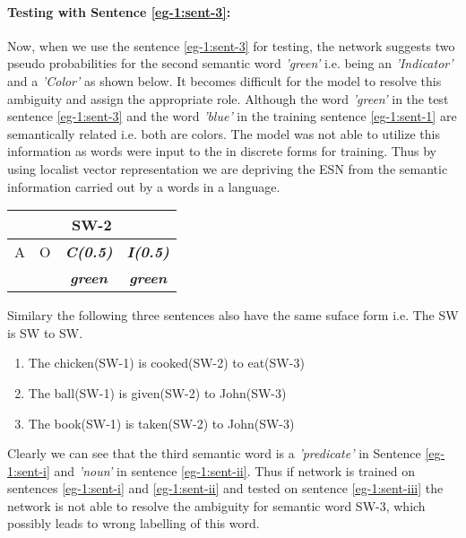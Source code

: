 \paragraph{Testing with Sentence \ref{eg-1:sent-3}:} Now, when we use the sentence \ref{eg-1:sent-3} for testing, the network suggests two pseudo probabilities for the second semantic word \textit{'green'} i.e. being an \textit{'Indicator'} and a \textit{'Color'} as shown below. It becomes difficult for the model to resolve this ambiguity and assign the appropriate role. Although the word \textit{'green'} in the test sentence \ref{eg-1:sent-3} and the word \textit{'blue'} in the training sentence \ref{eg-1:sent-1} are semantically related i.e. both are colors. The model was not able to utilize this information as words were input to the in discrete forms for training. Thus by using localist vector representation we are depriving the ESN from the semantic information carried out by a words in a language.

\begin{table}[hbtp]
\centering
\begin{minipage}{1.5in}
\begin{tabular}{|c|c|c|c|}
\hline
\multicolumn{4}{|c|}{\textbf{SW-2}}  \\ \hline
A	& O & \textit{\textbf{C(0.5)}}   & \textit{\textbf{I(0.5)}} \\ \hline
	&   & \textit{\textbf{green}} 	  & \textit{\textbf{green}} \\ \hline
\end{tabular}
\end{minipage}
\end{table}

\noindent Similary the following three sentences also have the same suface form i.e. The SW is SW to SW.

\begin{enumerate}[noitemsep,label=(\roman*)]
\item The chicken(SW-1) is cooked(SW-2) to eat(SW-3) \label{eg-1:sent-i}
\item The ball(SW-1) is given(SW-2) to John(SW-3) \label{eg-1:sent-ii}
\item The book(SW-1) is taken(SW-2) to John(SW-3) \label{eg-1:sent-iii}
\end{enumerate}

Clearly we can see that the third semantic word is a \textit{'predicate'} in Sentence \ref{eg-1:sent-i} and \textit{'noun'} in sentence \ref{eg-1:sent-ii}. Thus if network is trained on sentences \ref{eg-1:sent-i} and \ref{eg-1:sent-ii} and tested on sentence \ref{eg-1:sent-iii} the network is not able to resolve the ambiguity for semantic word SW-3, which possibly leads to wrong labelling of this word.


